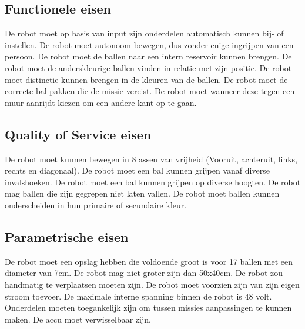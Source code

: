 \documentclass[12pt]{article} %
\begin{document}
\subsection{Functionele eisen}
\begin{enumerate}
 De robot moet op basis van input zijn onderdelen automatisch kunnen bij- of instellen.
 De robot moet autonoom bewegen, dus zonder enige ingrijpen van een persoon.
 De robot moet de ballen naar een intern reservoir kunnen brengen.
 De robot moet de anderskleurige ballen vinden in relatie met zijn positie.
 De robot moet distinctie kunnen brengen in de kleuren van de ballen. 
 De robot moet de correcte bal pakken die de missie vereist.
 De robot moet wanneer deze tegen een muur aanrijdt kiezen om een andere kant op te gaan.
\end{enumerate}
\newpage

\subsection{Quality of Service eisen}
\begin{enumerate}
 De robot moet kunnen bewegen in 8 assen van vrijheid (Vooruit, achteruit, links, rechts en diagonaal).
 De robot moet een bal kunnen grijpen vanaf diverse invalshoeken.
 De robot moet een bal kunnen grijpen op diverse hoogten.
 De robot mag ballen die zijn gegrepen niet laten vallen.
 De robot moet ballen kunnen onderscheiden in hun primaire of secundaire kleur.
\end{enumerate}

\subsection{Parametrische eisen}
\begin{enumerate}
 De robot moet een opslag hebben die voldoende groot is voor 17 ballen met een diameter van 7cm.
 De robot mag niet groter zijn dan 50x40cm.
 De robot zou handmatig te verplaatsen moeten zijn. 
 De robot moet voorzien zijn van zijn eigen stroom toevoer.
 De maximale interne spanning binnen de robot is 48 volt.
 Onderdelen moeten toegankelijk zijn om tussen missies aanpassingen te kunnen maken.
 De accu moet verwisselbaar zijn.
\end{enumerate}
\newpage
\end{document}
